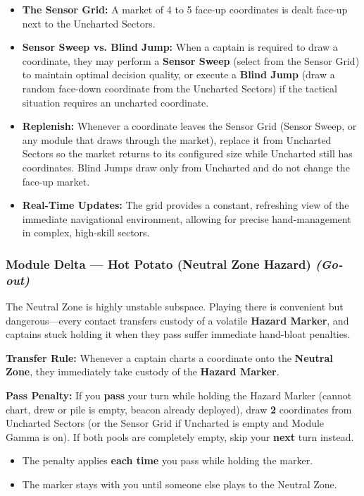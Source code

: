 \documentclass[11pt]{article}
\providecommand{\tightlist}{%
  \setlength{\itemsep}{0pt}\setlength{\parskip}{0pt}}
\begin{document}
\begin{itemize}
\tightlist
\item
  \textbf{The Sensor Grid:} A market of 4 to 5 face-up coordinates is
  dealt face-up next to the Uncharted Sectors.
\item
  \textbf{Sensor Sweep vs. Blind Jump:} When a captain is required to
  draw a coordinate, they may perform a \textbf{Sensor Sweep} (select
  from the Sensor Grid) to maintain optimal decision quality, or execute
  a \textbf{Blind Jump} (draw a random face-down coordinate from the
  Uncharted Sectors) if the tactical situation requires an uncharted
  coordinate.
\item
  \textbf{Replenish:} Whenever a coordinate leaves the Sensor Grid
  (Sensor Sweep, or any module that draws through the market), replace it
  from Uncharted Sectors so the market returns to its configured size
  while Uncharted still has coordinates. Blind Jumps draw only from
  Uncharted and do not change the face-up market.
\item
  \textbf{Real-Time Updates:} The grid provides a constant, refreshing
  view of the immediate navigational environment, allowing for precise
  hand-management in complex, high-skill sectors.
\end{itemize}

\subsubsection{Module Delta --- Hot Potato (Neutral Zone Hazard)
\emph{(Go-out)}}\label{module-delta-hot-potato-go-out}

The Neutral Zone is highly unstable subspace. Playing there is
convenient but dangerous---every contact transfers custody of a volatile
\textbf{Hazard Marker}, and captains stuck holding it when they pass
suffer immediate hand-bloat penalties.

\textbf{Transfer Rule:} Whenever a captain charts a coordinate onto the
\textbf{Neutral Zone}, they immediately take custody of the
\textbf{Hazard Marker}.

\textbf{Pass Penalty:} If you \textbf{pass} your turn while holding the
Hazard Marker (cannot chart, drew or pile is empty, beacon already
deployed), draw \textbf{2} coordinates from Uncharted Sectors (or the
Sensor Grid if Uncharted is empty and Module Gamma is on). If both pools
are completely empty, skip your \textbf{next} turn instead.

\begin{itemize}
\tightlist
\item
  The penalty applies \textbf{each time} you pass while holding the
  marker.
\item
  The marker stays with you until someone else plays to the Neutral Zone.
\end{itemize}
\end{document}
